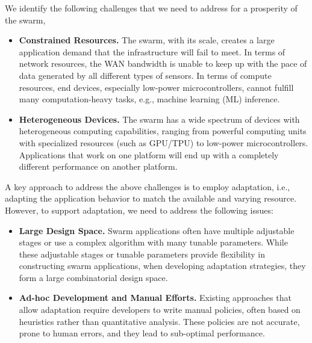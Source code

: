 \documentclass[thesis.tex]{subfiles}
\begin{document}
We identify the following challenges that we need to address for a prosperity of
the swarm,

\begin{itemize}[topsep=5pt, itemsep=2pt, leftmargin=10pt]

\item \textbf{Constrained Resources.} The swarm, with its scale, creates a large
  application demand that the infrastructure will fail to meet. In terms of
  network resources, the WAN bandwidth is unable to keep up with the pace of
  data generated by all different types of sensors. In terms of compute
  resources, end devices, especially low-power microcontrollers, cannot fulfill
  many computation-heavy tasks, e.g., machine learning (ML) inference.

\item \textbf{Heterogeneous Devices.} The swarm has a wide spectrum of devices
  with heterogeneous computing capabilities, ranging from powerful computing
  units with specialized resources (such as GPU/TPU) to low-power
  microcontrollers. Applications that work on one platform will end up with a
  completely different performance on another platform.

\end{itemize}

A key approach to address the above challenges is to employ adaptation, i.e.,
adapting the application behavior to match the available and varying
resource. However, to support adaptation, we need to address the following
issues:

\begin{itemize}[topsep=5pt, itemsep=2pt, leftmargin=10pt]

\item \textbf{Large Design Space.} Swarm applications often have multiple
  adjustable stages or use a complex algorithm with many tunable
  parameters. While these adjustable stages or tunable parameters provide
  flexibility in constructing swarm applications, when developing adaptation
  strategies, they form a large combinatorial design space.

\item \textbf{Ad-hoc Development and Manual Efforts.} Existing approaches that
  allow adaptation require developers to write manual policies, often based on
  heuristics rather than quantitative analysis. These policies are not accurate,
  prone to human errors, and they lead to sub-optimal performance.

\end{itemize}
\end{document}
